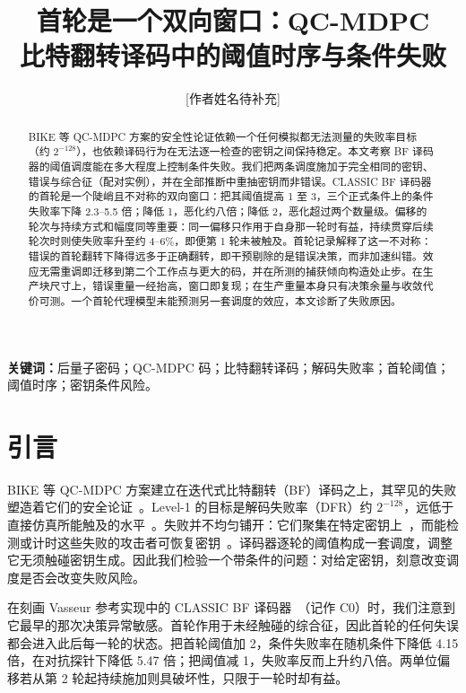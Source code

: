 \documentclass[UTF8,a4paper,10pt,twocolumn]{ctexart}
\title{\vspace{-1.2em}\heiti\zihao{3} 首轮是一个双向窗口：QC-MDPC\\比特翻转译码中的阈值时序与条件失败}
\author{\zihao{5} [作者姓名待补充]\\[0.2em]
\zihao{6}\mdseries [单位与通讯邮箱待补充]}
\date{}
\begin{document}
\maketitle

\begin{abstract}
BIKE 等 QC-MDPC 方案的安全性论证依赖一个任何模拟都无法测量的失败率目标（约 $2^{-128}$），也依赖译码行为在无法逐一检查的密钥之间保持稳定。本文考察 BF 译码器的阈值调度能在多大程度上控制条件失败。我们把两条调度施加于完全相同的密钥、错误与综合征（配对实例），并在全部推断中重抽密钥而非错误。CLASSIC BF 译码器的首轮是一个陡峭且不对称的双向窗口：把其阈值提高 1 至 3，三个正式条件上的条件失败率下降 2.3--5.5 倍；降低 1，恶化约八倍；降低 2，恶化超过两个数量级。偏移的轮次与持续方式和幅度同等重要：同一偏移只作用于自身那一轮时有益，持续贯穿后续轮次时则使失败率升至约 4--6\%，即便第 1 轮未被触及。首轮记录解释了这一不对称：错误的首轮翻转下降得远多于正确翻转，即干预剔除的是错误决策，而非加速纠错。效应无需重调即迁移到第二个工作点与更大的码，并在所测的捕获倾向构造处止步。在生产块尺寸上，错误重量一经抬高，窗口即复现；在生产重量本身只有决策余量与收敛代价可测。一个首轮代理模型未能预测另一套调度的效应，本文诊断了失败原因。
\end{abstract}

\vspace{0.6em}

\noindent\textbf{关键词：}后量子密码；QC-MDPC 码；比特翻转译码；解码失败率；首轮阈值；阈值时序；密钥条件风险。

\vspace{0.8em}

\section{引言}\label{sec:intro}

BIKE 等 QC-MDPC 方案建立在迭代式比特翻转（BF）译码之上，其罕见的失败塑造着它们的安全论证~\cite{misoczki2013mdpc,bike2024spec,alagic2025nist}。Level-1 的目标是解码失败率（DFR）约 $2^{-128}$，远低于直接仿真所能触及的水平~\cite{sendrier2019dfr,vasseur2021thesis}。失败并不均匀铺开：它们聚集在特定密钥上~\cite{guo2016key,wang2023weak,nosouhi2023weakkey}，而能检测或计时这些失败的攻击者可恢复密钥~\cite{eaton2018timing}。译码器逐轮的阈值构成一套调度，调整它无须触碰密钥生成。因此我们检验一个带条件的问题：对给定密钥，刻意改变调度是否会改变失败风险。

在刻画 Vasseur 参考实现中的 CLASSIC BF 译码器~\cite{vasseur2021thesis}（记作 C0）时，我们注意到它最早的那次决策异常敏感。首轮作用于未经触碰的综合征，因此首轮的任何失误都会进入此后每一轮的状态。把首轮阈值加 2，条件失败率在随机条件下降低 4.15 倍，在对抗探针下降低 5.47 倍；把阈值减 1，失败率反而上升约八倍。两单位偏移若从第 2 轮起持续施加则具破坏性，只限于一轮时却有益。
\end{document}
